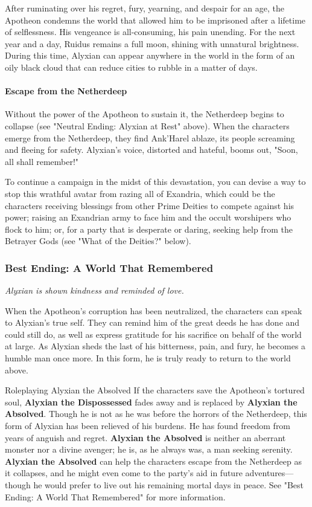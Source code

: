 \documentclass[letterpaper, 11pt, bg=full, twocolumn]{dndbook}
\begin{document}
After ruminating over his regret, fury, yearning, and despair for an age, the Apotheon condemns the world that allowed him to be imprisoned after a lifetime of selflessness. His vengeance is all-consuming, his pain unending. For the next year and a day, Ruidus remains a full moon, shining with unnatural brightness. During this time, Alyxian can appear anywhere in the world in the form of an oily black cloud that can reduce cities to rubble in a matter of days.

\paragraph{Escape from the Netherdeep}

Without the power of the Apotheon to sustain it, the Netherdeep begins to collapse (see "Neutral Ending: Alyxian at Rest" above). When the characters emerge from the Netherdeep, they find Ank'Harel ablaze, its people screaming and fleeing for safety. Alyxian's voice, distorted and hateful, booms out, "Soon, all shall remember!"

To continue a campaign in the midst of this devastation, you can devise a way to stop this wrathful avatar from razing all of Exandria, which could be the characters receiving blessings from other Prime Deities to compete against his power; raising an Exandrian army to face him and the occult worshipers who flock to him; or, for a party that is desperate or daring, seeking help from the Betrayer Gods (see "What of the Deities?" below).

\subsubsection{Best Ending: A World That Remembered}

\textit{Alyxian is shown kindness and reminded of love.}

When the Apotheon's corruption has been neutralized, the characters can speak to Alyxian's true self. They can remind him of the great deeds he has done and could still do, as well as express gratitude for his sacrifice on behalf of the world at large. As Alyxian sheds the last of his bitterness, pain, and fury, he becomes a humble man once more. In this form, he is truly ready to return to the world above.

\begin{DndSidebar}{Roleplaying Alyxian the Absolved}
If the characters save the Apotheon's tortured soul, \textbf{Alyxian the Dispossessed} fades away and is replaced by \textbf{Alyxian the Absolved}. Though he is not as he was before the horrors of the Netherdeep, this form of Alyxian has been relieved of his burdens. He has found freedom from years of anguish and regret. \textbf{Alyxian the Absolved} is neither an aberrant monster nor a divine avenger; he is, as he always was, a man seeking serenity.
\textbf{Alyxian the Absolved} can help the characters escape from the Netherdeep as it collapses, and he might even come to the party's aid in future adventures---though he would prefer to live out his remaining mortal days in peace. See "Best Ending: A World That Remembered" for more information.
\end{DndSidebar}
\end{document}

